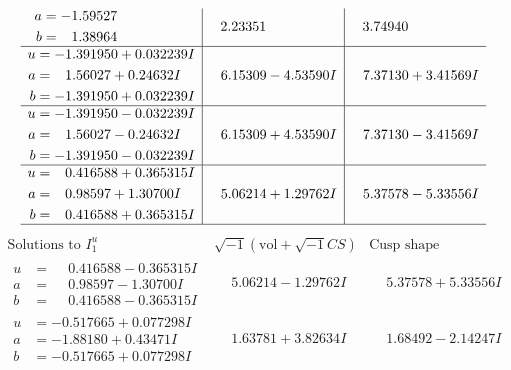 \documentclass[1p]{elsarticle_modified}
\theoremstyle{definition}
\newcommand{\I}{\sqrt{-1}}
\begin{document}
$$\begin{array}{c|c|c}
\begin{aligned}
a &= -1.59527\phantom{ +0.000000I} \\
b &= \phantom{-}1.38964\phantom{ +0.000000I}\end{aligned}
 & \phantom{-}2.23351\phantom{ +0.000000I} & \phantom{-}3.74940\phantom{ +0.000000I} \\ \hline\begin{aligned}
u &= -1.391950 + 0.032239 I \\
a &= \phantom{-}1.56027 + 0.24632 I \\
b &= -1.391950 + 0.032239 I\end{aligned}
 & \phantom{-}6.15309 - 4.53590 I & \phantom{-}7.37130 + 3.41569 I \\ \hline\begin{aligned}
u &= -1.391950 - 0.032239 I \\
a &= \phantom{-}1.56027 - 0.24632 I \\
b &= -1.391950 - 0.032239 I\end{aligned}
 & \phantom{-}6.15309 + 4.53590 I & \phantom{-}7.37130 - 3.41569 I \\ \hline\begin{aligned}
u &= \phantom{-}0.416588 + 0.365315 I \\
a &= \phantom{-}0.98597 + 1.30700 I \\
b &= \phantom{-}0.416588 + 0.365315 I\end{aligned}
 & \phantom{-}5.06214 + 1.29762 I & \phantom{-}5.37578 - 5.33556 I\\
 \hline 
 \end{array}$$\newpage$$\begin{array}{c|c|c}  
\text{Solutions to }I^u_{1}& \I (\text{vol} + \sqrt{-1}CS) & \text{Cusp shape}\\
 \hline 
\begin{aligned}
u &= \phantom{-}0.416588 - 0.365315 I \\
a &= \phantom{-}0.98597 - 1.30700 I \\
b &= \phantom{-}0.416588 - 0.365315 I\end{aligned}
 & \phantom{-}5.06214 - 1.29762 I & \phantom{-}5.37578 + 5.33556 I \\ \hline\begin{aligned}
u &= -0.517665 + 0.077298 I \\
a &= -1.88180 + 0.43471 I \\
b &= -0.517665 + 0.077298 I\end{aligned}
 & \phantom{-}1.63781 + 3.82634 I & \phantom{-}1.68492 - 2.14247 I \\ \hline\begin{aligned}

\end{aligned}
\end{array}$$
\end{document}
